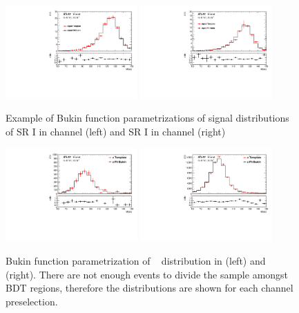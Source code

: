 \begin{figure}[htbp]
  \centering    
 \includegraphics[width=0.45\textwidth]{figures/VBF/sig_2cen_SRI.pdf}
 \includegraphics[width=0.45\textwidth]{figures/VBF/sig_4cen_SRI.pdf}

\caption{Example of Bukin function parametrizations of signal \Mbb{} distributions of SR I in \twocentral channel (left) and SR I in \fourcentral channel (right)}
  \label{fig:vbf-sigpar_alt}
\end{figure}


\begin{figure}[htbp]
  \centering    
 \includegraphics[width=0.45\textwidth]{figures/VBF/SigPar/z_2cen.pdf}
 \includegraphics[width=0.45\textwidth]{figures/VBF/SigPar/z_4cen.pdf}

\caption{Bukin function parametrization of \zjets~\Mbb{} distribution in \twocentral (left) and \fourcentral (right). There are not enough events to divide the sample amongst BDT regions, therefore the distributions are shown for each channel preselection.}
\label{fig:vbf-zpar_alt}
\end{figure}


